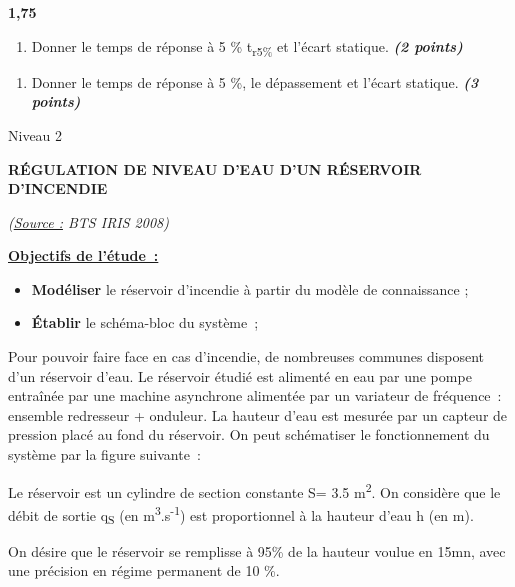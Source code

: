 
\textbf{1,75}

\begin{enumerate}
\def\labelenumi{\arabic{enumi}.}
\setcounter{enumi}{1}
\item
  Donner le temps de réponse à 5 \% t\textsubscript{r5\%} et l'écart
  statique. \emph{\textbf{(2 points)}}
\end{enumerate}


\begin{enumerate}
\def\labelenumi{\arabic{enumi}.}
\setcounter{enumi}{2}
\item
  Donner le temps de réponse à 5 \%, le dépassement et l'écart statique.
  \emph{\textbf{(3 points)}}
\end{enumerate}


Niveau 2

\textbf{RÉGULATION DE NIVEAU D'EAU D'UN RÉSERVOIR D'INCENDIE}

\emph{(\ul{Source :} BTS IRIS 2008)}

\textbf{\ul{Objectifs de l'étude~:}}

\begin{itemize}
\item
  \textbf{Modéliser} le réservoir d'incendie à partir du modèle de
  connaissance ;
\item
  \textbf{Établir} le schéma-bloc du système~;
\end{itemize}

Pour pouvoir faire face en cas d'incendie, de nombreuses communes
disposent d'un réservoir d'eau. Le réservoir étudié est alimenté en eau
par une pompe entraînée par une machine asynchrone alimentée par un
variateur de fréquence~: ensemble redresseur + onduleur. La hauteur
d'eau est mesurée par un capteur de pression placé au fond du réservoir.
On peut schématiser le fonctionnement du système par la figure
suivante~:


Le réservoir est un cylindre de section constante S= 3.5
m\textsuperscript{2}. On considère que le débit de sortie
q\textsubscript{S} (en m\textsuperscript{3}.s\textsuperscript{-1}) est
proportionnel à la hauteur d'eau h (en m).

On désire que le réservoir se remplisse à 95\% de la hauteur voulue en
15mn, avec une précision en régime permanent de 10 \%.

